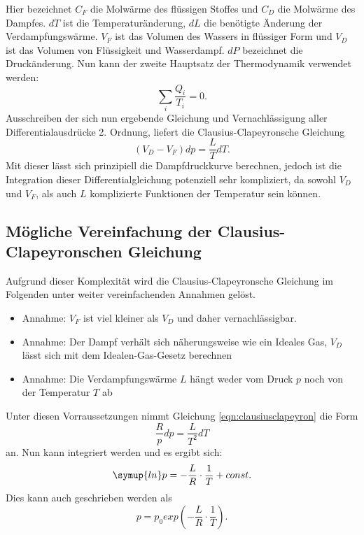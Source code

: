     Hier bezeichnet $C_{F}$ die Molwärme des flüssigen Stoffes und $C_{D}$ die Molwärme des Dampfes. $dT$ ist die
    Temperaturänderung, $dL$ die benötigte Änderung der Verdampfungswärme. $V_{F}$ ist das Volumen des Wassers in flüssiger Form und
    $V_{D}$ ist das Volumen von Flüssigkeit und Wasserdampf. $dP$ bezeichnet die Druckänderung. Nun kann der zweite Hauptsatz der Thermodynamik verwendet
    werden:
    \begin{equation*}
      \label{eqn:zweiterhauptsatz}
      \sum_{i}^{} \frac{Q_{i}}{T_{i}} = 0.
    \end{equation*}
    Ausschreiben der sich nun ergebende Gleichung und Vernachlässigung aller Differentialausdrücke 2. Ordnung, liefert
    die Clausius-Clapeyronsche Gleichung
    \begin{equation}
      \label{eqn:clausiusclapeyron}
      (V_{D} - V_{F})dp = \frac{L}{T} dT.
    \end{equation}
    Mit dieser lässt sich prinzipiell die Dampfdruckkurve berechnen, jedoch ist die Integration dieser Differentialgleichung
    potenziell sehr kompliziert, da sowohl $V_{D}$ und $V_{F}$, als auch $L$ komplizierte Funktionen der Temperatur sein können.
    \subsection{Mögliche Vereinfachung der Clausius-Clapeyronschen Gleichung}
    Aufgrund dieser Komplexität wird die Clausius-Clapeyronsche Gleichung im Folgenden unter weiter vereinfachenden Annahmen
    gelöst.
    \begin{itemize}
      \item Annahme: $V_{F}$ ist viel kleiner als $V_{D}$ und daher vernachlässigbar.
      \item Annahme: Der Dampf verhält sich näherungsweise wie ein Ideales Gas, $V_{D}$ lässt sich mit dem Idealen-Gas-Gesetz
      berechnen
      \item Annahme: Die Verdampfungswärme $L$ hängt weder vom Druck $p$ noch von der Temperatur $T$ ab
    \end{itemize}
    Unter diesen Vorraussetzungen nimmt Gleichung \eqref{eqn:clausiusclapeyron} die Form
    \begin{equation*}
      \frac{R}{p} dp = \frac{L}{T^{2}} dT
    \end{equation*}
    an. Nun kann integriert werden und es ergibt sich:
    \begin{equation}
      \label{clausiusclapeyronintegriertln}
      \symup{ln}p = - \frac{L}{R} \cdot \frac{1}{T} + const.
    \end{equation}
    Dies kann auch geschrieben werden als
    \begin{equation}
      \label{clausiusclapeyronintegriertexp}
      p = p_{0} exp(- \frac{L}{R} \cdot \frac{1}{T}).
    \end{equation}
\label{sec:Theorie}
